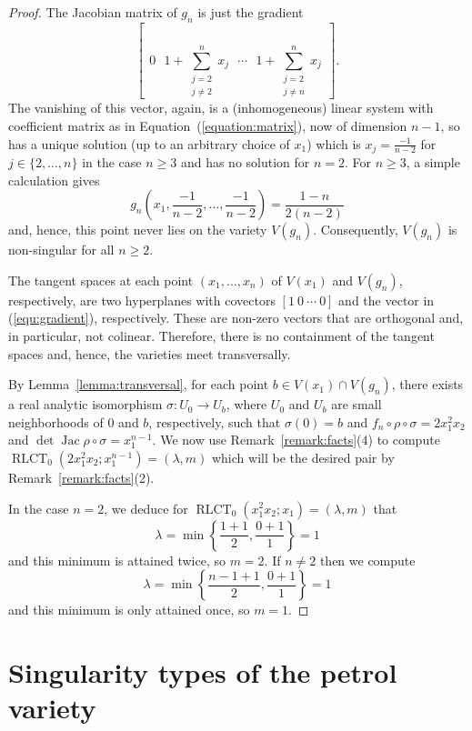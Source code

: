 \documentclass[11pt]{amsart}
\DeclareMathOperator{\rlct}{RLCT}
\DeclareMathOperator{\jac}{Jac}
\numberwithin{equation}{section}
\theoremstyle{plain}
\theoremstyle{definition}
\begin{document}
\begin{proof}
    The Jacobian matrix of $g_n$ is just the gradient
   \begin{equation}\label{equ:gradient}
    \left[ \ \ 0 \ \ \  1 + \sum_{\substack{j = 2 \\ j \neq 2}}^n x_j \ \ \ \cdots \ \ \ 1 + \sum_{\substack{j = 2 \\ j \neq n}}^n x_j \ \ \right].
    \end{equation}
    The vanishing of this vector, again, is a (inhomogeneous) linear system with coefficient matrix as in Equation~(\ref{equation:matrix}), now of dimension $n-1$, so has a unique solution (up to an arbitrary choice of $x_1$) which is $x_j = \frac{-1}{n-2}$ for $j \in \{2,\ldots,n\}$ in the case $n \geq 3$ and has no solution for $n = 2$. For $n \geq 3$, a simple calculation gives
    \[
    g_n\left(x_1, \frac{-1}{n-2},\ldots,\frac{-1}{n-2}\right) = \frac{1-n}{2(n-2)} 
    \]
    and, hence, this point never lies on the variety $V(g_n)$. Consequently, $V(g_n)$ is non-singular for all $n \geq 2$. 

    The tangent spaces at each point $(x_1,\ldots,x_n)$ of $V(x_1)$ and $V(g_n)$, respectively, are two hyperplanes with covectors $[1 \ 0 \ \cdots \ 0]$ and the vector in (\ref{equ:gradient}), respectively. These are non-zero vectors that are orthogonal and, in particular, not colinear. Therefore, there is no containment of the tangent spaces and, hence, the varieties meet transversally.

    By Lemma~\ref{lemma:transversal}, for each point $b \in V(x_1) \cap V(g_n)$, there exists a real analytic isomorphism $\sigma: U_0 \to U_b$, where $U_0$ and $U_b$ are small neighborhoods of $0$ and $b$, respectively, such that $\sigma(0) = b$ and $f_n \circ \rho \circ \sigma = 2x_1^2x_2$ and $\det \jac \rho \circ \sigma = x_1^{n-1}$. We now use Remark~\ref{remark:facts}(4) to compute $\rlct_0(2x_1^2x_2;  x_1^{n-1}) = (\lambda,m)$ which will be the desired pair by Remark~\ref{remark:facts}(2).

    In the case $n = 2$, we deduce for $\rlct_0(x_1^2x_2;x_1) = (\lambda,m)$ that
    \[
     \lambda = \min \left\{ \frac{1+1}{2}, \frac{0+1}{1} \right\} = 1
    \]
    and this minimum is attained twice, so $m = 2$. If $n \neq 2$ then we compute
    \[
    \lambda = \min \left\{ \frac{n-1+1}{2}, \frac{0+1}{1} \right\} = 1
    \]
    and this minimum is only attained once, so $m = 1$.
\end{proof}

\section{Singularity types of the petrol variety}\label{sec:petrol}
\end{document}
